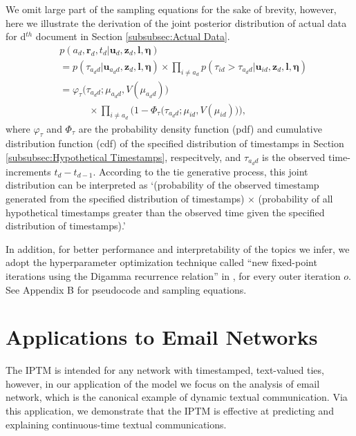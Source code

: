 \documentclass{article}
\begin{document}
We omit large part of the sampling equations for the sake of brevity, however, here we illustrate the derivation of the joint posterior distribution of actual data for d$^{th}$ document in Section \ref{subsubsec:Actual Data}. 
\begin{equation*}
\begin{aligned}
&p(a_d, \boldsymbol{r}_d, t_d|\boldsymbol{u}_{d}, \boldsymbol{z}_d,\boldsymbol{l}, \boldsymbol{\eta}) \\&= p(\tau_{a_d d}|\boldsymbol{u}_{a_dd},\boldsymbol{z}_d,\boldsymbol{l}, \boldsymbol{\eta})\times \prod_{i\neq a_d} p(\tau_{id} >\tau_{a_d d}|\boldsymbol{u}_{id},\boldsymbol{z}_d,\boldsymbol{l}, \boldsymbol{\eta}) \\& 
= \varphi_{\tau}\big(\tau_{a_d d}; \mu_{a_d d}, V(\mu_{a_d d})\big)\\&\quad\quad\quad \times  \prod_{i\neq a_d}\Big(1-\Phi_{\tau} \big(\tau_{a_d d}; \mu_{i d}, V(\mu_{i d})\big) \Big),
\end{aligned}
\label{eqn:tieposterior}
\end{equation*}  
where $\varphi_\tau$ and $\Phi_\tau$ are the probability density function (pdf) and cumulative distribution function (cdf) of the specified distribution of timestamps in Section \ref{subsubsec:Hypothetical Timestamps}, respecitvely, and $\tau_{a_d d}$ is the observed time-increments $t_d - t_{d-1}$. According to the tie generative process, this joint distribution can be interpreted as `(probability of the observed timestamp generated from the specified distribution of timestamps) $\times$ (probability of all hypothetical timestamps greater than the observed time given the specified distribution of timestamps).' 

In addition, for better performance and interpretability of the topics we infer, we adopt the hyperparameter optimization technique called ``new fixed-point iterations using the Digamma recurrence relation'' in \cite{wallach2008structured}, for every outer iteration $o$. See Appendix B for pseudocode and sampling equations.  

\section{Applications to Email Networks}\label{sec:Application}
The IPTM is intended for any network with timestamped, text-valued ties, however, in our application of the model we focus on the analysis of email network, which is the canonical example of dynamic textual communication. Via this application, we demonstrate that the IPTM is effective at predicting
and explaining continuous-time textual communications.
\end{document}
